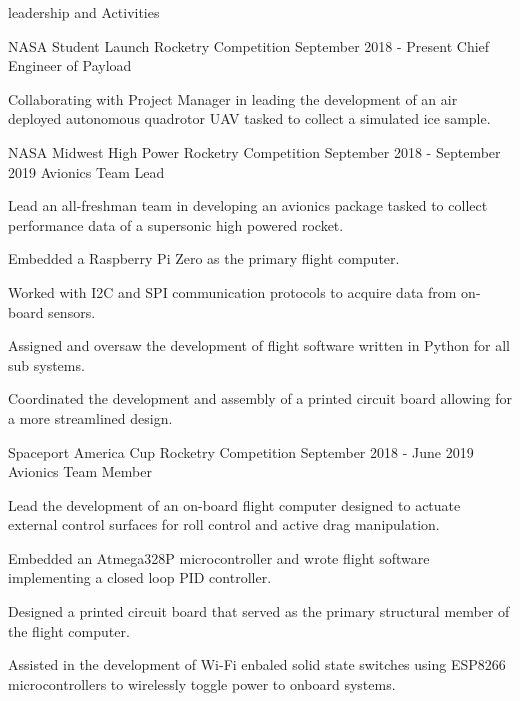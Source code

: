 \documentclass{resume} %
\begin{document}
\begin{rSection} {leadership and Activities}

    \begin{rSubsection} {NASA Student Launch Rocketry Competition} {September 2018 - Present} {Chief Engineer of Payload}

        \item Collaborating with Project Manager in leading the development of an air deployed autonomous quadrotor UAV tasked to collect a simulated ice sample.

    \end{rSubsection}



    \begin{rSubsection} {NASA Midwest High Power Rocketry Competition} {September 2018 - September 2019} {Avionics Team Lead}

        \item Lead an all-freshman team in developing an avionics package tasked to collect performance data of a supersonic high powered rocket.
        \item Embedded a Raspberry Pi Zero as the primary flight computer.
        \item Worked with I2C and SPI communication protocols to acquire data from on-board sensors.
        \item Assigned and oversaw the development of flight software written in Python for all sub systems.
        \item Coordinated the development and assembly of a printed circuit board allowing for a more streamlined design.

    \end{rSubsection}


    \begin{rSubsection} {Spaceport America Cup Rocketry Competition} {September 2018 - June 2019} {Avionics Team Member}

        \item Lead the development of an on-board flight computer designed to actuate external control surfaces for roll control and active drag manipulation.
        \item Embedded an Atmega328P microcontroller and wrote flight software implementing a closed loop PID controller.
        \item Designed a printed circuit board that served as the primary structural member of the flight computer.
        \item Assisted in the development of Wi-Fi enbaled solid state switches using ESP8266 microcontrollers to wirelessly toggle power to onboard systems.

    \end{rSubsection}

\end{rSection}
\end{document}

